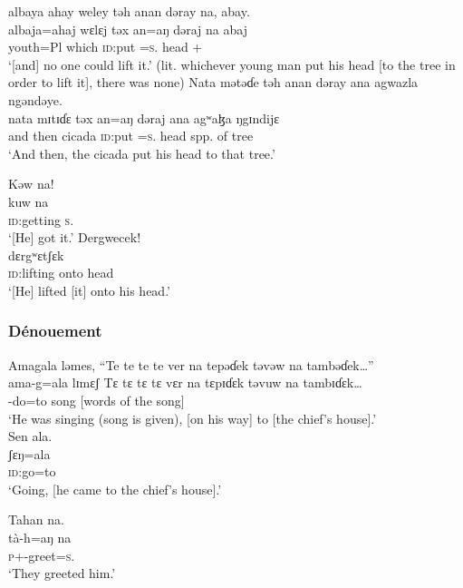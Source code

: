 \medskip
 albaya  ahay  weley  təh  anan  dəray  na, abay.\\
 \gll albaja=ahaj   wɛlɛj  təx     an=aŋ         dəraj   na  abaj\\
 youth=Pl    which   \textsc{id}:put   {\DAT}=\textsc{s}.{\IO}   head   {\PSP}   {{\EXT}+{\NEG}}\\
 \glt ‘[and] no one could lift it.’ (lit. whichever young man put his head [to the tree in order to lift it], there was none)
 \z
\ea  Nata  mətəɗe  təh  anan  dəray  ana  agwazla  ngəndəye.\\
 \gll nata  mɪtɪɗɛ  təx  an=aŋ    dəraj  ana  agʷaɮa  ŋgɪndijɛ\\
 {and then}   cicada   \textsc{id}:put    {\DAT}=\textsc{s}.{\IO}   head   {\DAT}  {spp. of tree}    {\DEM}\\
 \glt ‘And then,  the cicada put his head to that tree.’
 \z
 
\ea  Kəw  na! \\
 \gll kuw  na\\
 \textsc{id}:getting  \textsc{s}.{\DO}  \\
 \glt ‘[He] got it.’ 
 \z
\ea  Dergwecek!\\
 \gll dɛrgʷɛtʃɛk\\
 \textsc{id}:{lifting onto head}\\
 \glt ‘[He] lifted [it] onto his head.’
 \z
 \subsubsection*{Dénouement}
\ea  Amagala  ləmes,  {“Te te te te ver na tepəɗek təvəw na tambəɗek…”}\\
 \gll ama-g=ala    lɪmɛʃ  {Tɛ tɛ tɛ tɛ vɛr na tɛpɪɗɛk təvuw na tambɪɗɛk…}\\
 {{\DEP}-do=to}  song  {[words of the song]}\\
 \glt ‘He was singing (song is given), [on his way] to [the chief’s house].’\\
 \z
\ea  Sen  ala.  \\
 \gll ʃɛŋ=ala\\
 \textsc{id}:go=to\\
 \glt ‘Going, [he came to the chief’s house].’  \\
 \z

 \ea  Tahan  na.\\
 \gll tà-h=aŋ      na\\
 \textsc{p}+{\PFV}-greet=\textsc{s}.{\IO}   {\PSP}\\
 \glt ‘They greeted him.’
 \z
 
